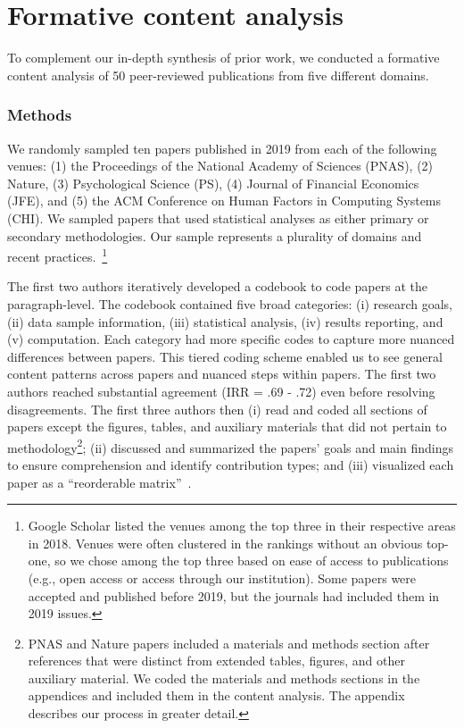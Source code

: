 \section{Formative content analysis} \label{sec:litSurvey} 
To complement our in-depth synthesis of prior work, we conducted a formative
content analysis of 50 peer-reviewed publications from five different domains. 

\subsubsection{Methods}
We randomly sampled ten papers published in 2019 from each of the following
venues: (1) the Proceedings of the National Academy of Sciences (PNAS), (2)
Nature, (3) Psychological Science (PS), (4) Journal of Financial Economics
(JFE), and (5) the ACM Conference on Human Factors in Computing Systems (CHI).
We sampled papers that used statistical analyses as either primary or secondary
methodologies. Our sample represents a plurality of domains and recent
practices.~\footnote{Google Scholar listed the venues among the top three in
their respective areas in 2018. Venues were often clustered in the rankings
without an obvious top-one, so we chose among the top three based on ease of
access to publications (e.g., open access or access through our institution).
Some papers were accepted and published before 2019, but the journals had
included them in 2019 issues.}


The first two authors iteratively developed a codebook to code papers at the
paragraph-level. The codebook contained five broad categories: (i) research
goals, (ii) data sample information, (iii) statistical analysis, (iv) results
reporting, and (v) computation. Each category had more specific codes to capture
more nuanced differences between papers. This tiered coding scheme enabled us to
see general content patterns across papers and nuanced steps within papers. The
first two authors reached substantial agreement (IRR = .69 - .72) even before
resolving disagreements. The first three authors then (i) read and coded all
sections of papers except the figures, tables, and auxiliary materials that did
not pertain to methodology\footnote{PNAS and Nature papers included a materials
and methods section after references that were distinct from extended tables,
figures, and other auxiliary material. We coded the materials and methods
sections in the appendices and included them in the content analysis. The appendix describes our process in greater detail.}; (ii) discussed
and summarized the papers' goals and main findings to ensure comprehension and
identify contribution types; and (iii) visualized each paper as a ``reorderable
matrix''~\cite{bertin2011graphics}. 

